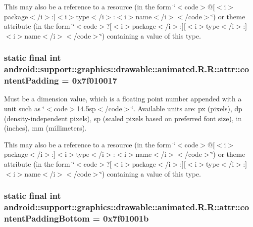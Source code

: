 This may also be a reference to a resource (in the form \char`\"{}$<$code$>$@\mbox{[}$<$i$>$package$<$/i$>$:\mbox{]}$<$i$>$type$<$/i$>$:$<$i$>$name$<$/i$>$$<$/code$>$\char`\"{}) or theme attribute (in the form \char`\"{}$<$code$>$?\mbox{[}$<$i$>$package$<$/i$>$:\mbox{]}\mbox{[}$<$i$>$type$<$/i$>$:\mbox{]}$<$i$>$name$<$/i$>$$<$/code$>$\char`\"{}) containing a value of this type. \hypertarget{classandroid_1_1support_1_1graphics_1_1drawable_1_1animated_1_1_r_1_1attr_5e0911a417853ff46f0554281cc69fe1}{
\subsubsection[{contentPadding}]{\setlength{\rightskip}{0pt plus 5cm}static final int android::support::graphics::drawable::animated.R.R::attr::contentPadding = 0x7f010017}}
\label{classandroid_1_1support_1_1graphics_1_1drawable_1_1animated_1_1_r_1_1attr_5e0911a417853ff46f0554281cc69fe1}


Must be a dimension value, which is a floating point number appended with a unit such as \char`\"{}$<$code$>$14.5sp$<$/code$>$\char`\"{}. Available units are: px (pixels), dp (density-independent pixels), sp (scaled pixels based on preferred font size), in (inches), mm (millimeters). 

This may also be a reference to a resource (in the form \char`\"{}$<$code$>$@\mbox{[}$<$i$>$package$<$/i$>$:\mbox{]}$<$i$>$type$<$/i$>$:$<$i$>$name$<$/i$>$$<$/code$>$\char`\"{}) or theme attribute (in the form \char`\"{}$<$code$>$?\mbox{[}$<$i$>$package$<$/i$>$:\mbox{]}\mbox{[}$<$i$>$type$<$/i$>$:\mbox{]}$<$i$>$name$<$/i$>$$<$/code$>$\char`\"{}) containing a value of this type. \hypertarget{classandroid_1_1support_1_1graphics_1_1drawable_1_1animated_1_1_r_1_1attr_d487613ecb2986727baacf6b69308ef8}{
\subsubsection[{contentPaddingBottom}]{\setlength{\rightskip}{0pt plus 5cm}static final int android::support::graphics::drawable::animated.R.R::attr::contentPaddingBottom = 0x7f01001b}}
\label{classandroid_1_1support_1_1graphics_1_1drawable_1_1animated_1_1_r_1_1attr_d487613ecb2986727baacf6b69308ef8}


